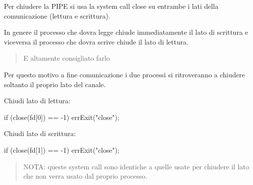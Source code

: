 Per chiudere la P\+I\+PE si usa la system call close su entrambe i lati della comunicazione (lettura e scrittura).

In genere il processo che dovra\textquotesingle{} legge chiude immediatamente il lato di scrittura e viceversa il processo che dovra\textquotesingle{} scrive chiude il lato di lettura. \begin{quote}
E\textquotesingle{} altamente consigliato farlo \end{quote}


Per questo motivo a fine comunicazione i due processi si ritroveranno a chiudere soltanto il proprio lato del canale.

Chiudi lato di lettura\+: 
\begin{DoxyCode}
\textcolor{keywordflow}{if} (close(fd[0]) == -1)
    errExit(\textcolor{stringliteral}{"close"});
\end{DoxyCode}


Chiudi lato di scrittura\+: 
\begin{DoxyCode}
\textcolor{keywordflow}{if} (close(fd[1]) == -1)
    errExit(\textcolor{stringliteral}{"close"});
\end{DoxyCode}


\begin{quote}
N\+O\+TA\+: queste system call sono identiche a quelle usate per chiudere il lato che non verra\textquotesingle{} usato dal proprio processo.\end{quote}
